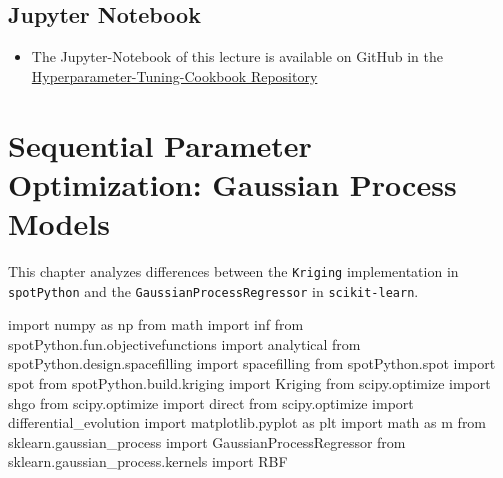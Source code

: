 \documentclass[
  letterpaper,
  DIV=11,
  numbers=noendperiod]{scrreprt}
\newenvironment{Shaded}{\begin{snugshade}}{\end{snugshade}}
\newcommand{\ImportTok}[1]{\textcolor[rgb]{0.00,0.46,0.62}{#1}}
\newcommand{\NormalTok}[1]{\textcolor[rgb]{0.00,0.23,0.31}{#1}}
\providecommand{\tightlist}{%
  \setlength{\itemsep}{0pt}\setlength{\parskip}{0pt}}\usepackage{longtable,booktabs,array}
\begin{document}
\section{Jupyter Notebook}\label{jupyter-notebook-9}

\begin{tcolorbox}[enhanced jigsaw, coltitle=black, bottomrule=.15mm, breakable, toprule=.15mm, colframe=quarto-callout-note-color-frame, title=\textcolor{quarto-callout-note-color}{\faInfo}\hspace{0.5em}{Note}, colbacktitle=quarto-callout-note-color!10!white, opacityback=0, left=2mm, leftrule=.75mm, colback=white, rightrule=.15mm, bottomtitle=1mm, toptitle=1mm, titlerule=0mm, arc=.35mm, opacitybacktitle=0.6]

\begin{itemize}
\tightlist
\item
  The Jupyter-Notebook of this lecture is available on GitHub in the
  \href{https://github.com/sequential-parameter-optimization/Hyperparameter-Tuning-Cookbook/blob/main/010_num_spot_sklearn_surrogate.ipynb}{Hyperparameter-Tuning-Cookbook
  Repository}
\end{itemize}

\end{tcolorbox}

\chapter{Sequential Parameter Optimization: Gaussian Process
Models}\label{sec-gaussian-process-models}

This chapter analyzes differences between the \texttt{Kriging}
implementation in \texttt{spotPython} and the
\texttt{GaussianProcessRegressor} in \texttt{scikit-learn}.

\begin{Shaded}
\begin{Highlighting}[]
\ImportTok{import}\NormalTok{ numpy }\ImportTok{as}\NormalTok{ np}
\ImportTok{from}\NormalTok{ math }\ImportTok{import}\NormalTok{ inf}
\ImportTok{from}\NormalTok{ spotPython.fun.objectivefunctions }\ImportTok{import}\NormalTok{ analytical}
\ImportTok{from}\NormalTok{ spotPython.design.spacefilling }\ImportTok{import}\NormalTok{ spacefilling}
\ImportTok{from}\NormalTok{ spotPython.spot }\ImportTok{import}\NormalTok{ spot}
\ImportTok{from}\NormalTok{ spotPython.build.kriging }\ImportTok{import}\NormalTok{ Kriging}
\ImportTok{from}\NormalTok{ scipy.optimize }\ImportTok{import}\NormalTok{ shgo}
\ImportTok{from}\NormalTok{ scipy.optimize }\ImportTok{import}\NormalTok{ direct}
\ImportTok{from}\NormalTok{ scipy.optimize }\ImportTok{import}\NormalTok{ differential\_evolution}
\ImportTok{import}\NormalTok{ matplotlib.pyplot }\ImportTok{as}\NormalTok{ plt}
\ImportTok{import}\NormalTok{ math }\ImportTok{as}\NormalTok{ m}
\ImportTok{from}\NormalTok{ sklearn.gaussian\_process }\ImportTok{import}\NormalTok{ GaussianProcessRegressor}
\ImportTok{from}\NormalTok{ sklearn.gaussian\_process.kernels }\ImportTok{import}\NormalTok{ RBF}
\end{Highlighting}
\end{Shaded}
\end{document}
